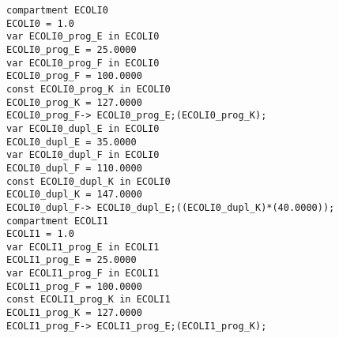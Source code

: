 \lstset{style=INTERMEDIATE}
\begin{lstlisting}
compartment ECOLI0
ECOLI0 = 1.0
var ECOLI0_prog_E in ECOLI0
ECOLI0_prog_E = 25.0000
var ECOLI0_prog_F in ECOLI0
ECOLI0_prog_F = 100.0000
const ECOLI0_prog_K in ECOLI0
ECOLI0_prog_K = 127.0000
ECOLI0_prog_F-> ECOLI0_prog_E;(ECOLI0_prog_K);
var ECOLI0_dupl_E in ECOLI0
ECOLI0_dupl_E = 35.0000
var ECOLI0_dupl_F in ECOLI0
ECOLI0_dupl_F = 110.0000
const ECOLI0_dupl_K in ECOLI0
ECOLI0_dupl_K = 147.0000
ECOLI0_dupl_F-> ECOLI0_dupl_E;((ECOLI0_dupl_K)*(40.0000));
compartment ECOLI1
ECOLI1 = 1.0
var ECOLI1_prog_E in ECOLI1
ECOLI1_prog_E = 25.0000
var ECOLI1_prog_F in ECOLI1
ECOLI1_prog_F = 100.0000
const ECOLI1_prog_K in ECOLI1
ECOLI1_prog_K = 127.0000
ECOLI1_prog_F-> ECOLI1_prog_E;(ECOLI1_prog_K);
\end{lstlisting}
